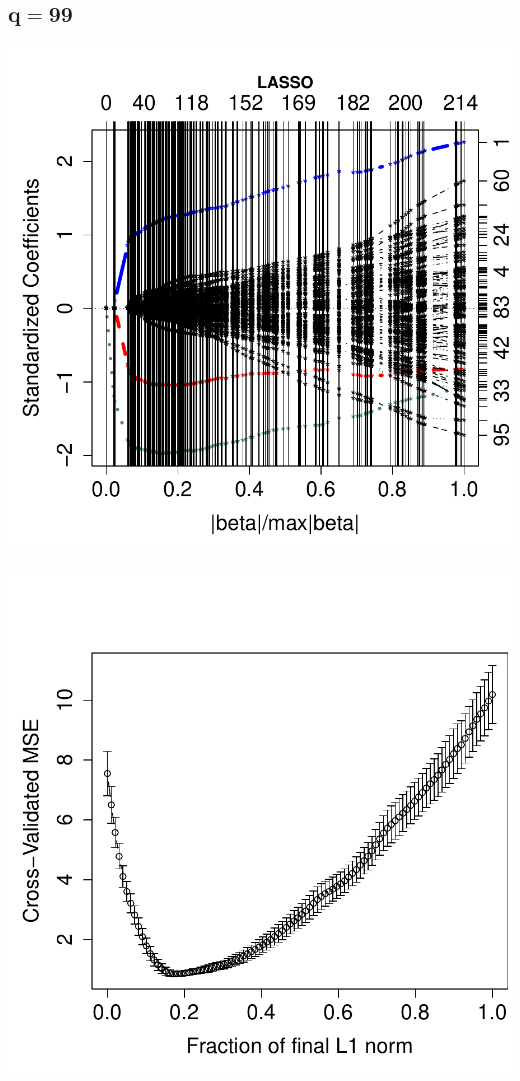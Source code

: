 \documentclass[a4paper]{article}
\begin{document}
\subsection{$\mathbf{q=99}$}
\vspace{-15pt}
\begin{minipage}[c]{0.6\linewidth}
\includegraphics{h4_ind-013}
\end{minipage}
\hspace{-50pt}
\begin{minipage}[c]{0.6\linewidth}
\includegraphics{h4_ind-014}
\end{minipage}\\
\end{document}
